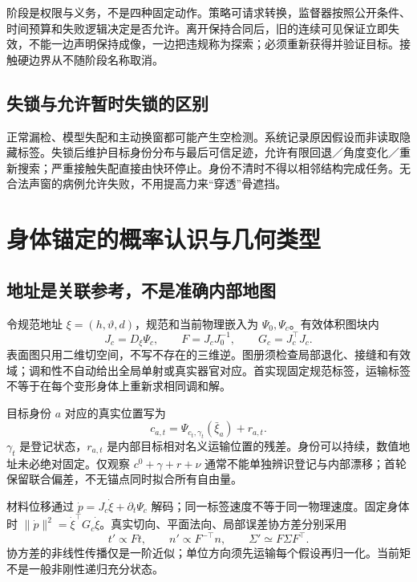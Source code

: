 \documentclass[UTF8,fontset=fandol,11pt,a4paper]{ctexart}
\theoremstyle{plain}
\theoremstyle{definition}
\theoremstyle{remark}
\numberwithin{equation}{section}
\begin{document}
阶段是权限与义务，不是四种固定动作。策略可请求转换，监督器按照公开条件、时间预算和失败逻辑决定是否允许。离开保持合同后，旧的连续可见保证立即失效，不能一边声明保持成像，一边把违规称为探索；必须重新获得并验证目标。接触硬边界从不随阶段名称取消。

\subsection{失锁与允许暂时失锁的区别}
正常漏检、模型失配和主动换窗都可能产生空检测。系统记录原因假设而非读取隐藏标签。失锁后维护目标身份分布与最后可信足迹，允许有限回退／角度变化／重新搜索；严重接触失配直接由快环停止。身份不清时不得以相邻结构完成任务。无合法声窗的病例允许失败，不用提高力来“穿透”骨遮挡。

\section{身体锚定的概率认识与几何类型}
\label{sec:belief}
\subsection{地址是关联参考，不是准确内部地图}
令规范地址 $\xi=(h,\vartheta,d)$，规范和当前物理嵌入为 $\Psi_0,\Psi_c$。有效体积图块内
\begin{equation}
J_c=D_\xi\Psi_c,\qquad F=J_cJ_0^{-1},\qquad G_c=J_c^\top J_c.
\end{equation}
表面图只用二维切空间，不写不存在的三维逆。图册须检查局部退化、接缝和有效域；调和性不自动给出全局单射或真实器官对应。首实现固定规范标签，运输标签不等于在每个变形身体上重新求相同调和解。

目标身份 $a$ 对应的真实位置写为
\begin{equation}
c_{a,t}=\Psi_{c_t,\gamma_t}(\bar\xi_a)+r_{a,t}.
\label{eq:bodyanchor}
\end{equation}
$\gamma_t$ 是登记状态，$r_{a,t}$ 是内部目标相对名义运输位置的残差。身份可以持续，数值地址未必绝对固定。仅观察 $c^0+\gamma+r+\nu$ 通常不能单独辨识登记与内部漂移；首轮保留联合偏差，不无锚点同时拟合所有自由量。

材料位移通过 $\dot p=J_c\dot\xi+\partial_t\Psi_c$ 解码；同一标签速度不等于同一物理速度。固定身体时 $\|\dot p\|^2=\dot\xi^\top G_c\dot\xi$。真实切向、平面法向、局部误差协方差分别采用
\begin{equation}
t'\propto Ft,\qquad n'\propto F^{-\top}n,\qquad \Sigma'\simeq F\Sigma F^\top.
\end{equation}
协方差的非线性传播仅是一阶近似；单位方向须先运输每个假设再归一化。当前矩不是一般非刚性递归充分状态。
\end{document}
